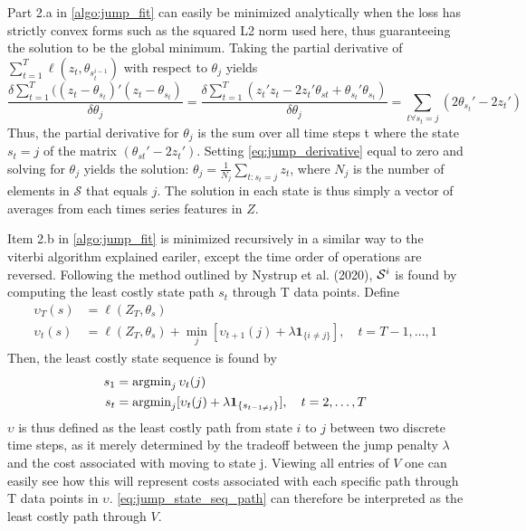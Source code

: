 Part 2.a in \cref{algo:jump_fit} can easily be minimized analytically when the loss has strictly convex forms such as the squared L2 norm used here, thus guaranteeing the solution to be the global minimum. Taking the partial derivative of $\sum_{t=1}^T \ell(z_t, \theta_{s_t^{i-1}})$ with respect to $\theta_j$ yields
\begin{equation}
   \frac{\delta \sum_{t=1}^{T} ((z_t-\theta_{s_t})'(z_t-\theta_{s_t}) }{\delta \theta_j}
   = \frac{\delta \sum_{t=1}^T (z_t'z_t - 2z_t'\theta_{st}+ \theta_{s_t}'\theta_{s_t} )}{\delta  \theta_j}
   = \sum_{t\forall s_t=j} ( 2\theta_{s_t}' - 2z_t' )
\label{eq:jump_derivative}
\end{equation}
Thus, the partial derivative for $\theta_j$ is the sum over all time steps t where the state $s_t=j$ of the matrix $(\theta_{st}'-2z_t')$. Setting \cref{eq:jump_derivative} equal to zero and solving for $\theta_j$ yields the solution: $\theta_j = \frac{1}{N_j} \sum_{t:s_t=j} z_t $, where $N_j$ is the number of elements in $\mathcal{S}$ that equals $j$. The solution in each state is thus simply a vector of averages from each times series features in $Z$.

Item 2.b in \cref{algo:jump_fit} is minimized recursively in a similar way to the viterbi algorithm explained eariler, except the time order of operations are reversed. Following the method outlined by Nystrup et al. (2020), $\S^i$ is found by computing the least costly state path $s_t$ through T data points. Define
\begin{align}
    \upsilon_T(s) &= \ell(Z_T, \theta_s) \\
    \upsilon_t(s) &= \ell(Z_T, \theta_s) + \min_j[\upsilon_{t+1}(j) + \lambda\mathbf{1}_{\{ i\ne j \}}],
    \quad t=T-1,\ldots,1
\label{eq:jump_cost_path}
\end{align}
Then, the least costly state sequence is found by
\begin{align}
    s_1 &= \argmin_j \upsilon_t(j) \\
    s_t &= \argmin_j[\upsilon_t(j) + \lambda\mathbf{1}_{\{ s_{t-1 \ne j} \}}], \quad t=2,\ldots,T
    \label{eq:jump_state_seq_path}
\end{align}
$\upsilon$ is thus defined as the least costly path from state $i$ to $j$ between two discrete time steps, as it merely determined by the tradeoff between the jump penalty $\lambda$ and the cost associated with moving to state j. Viewing all entries of $V$ one can easily see how this will represent costs associated with each specific path through T data points in $\upsilon$. \cref{eq:jump_state_seq_path} can therefore be interpreted as the least costly path through $V$. 

